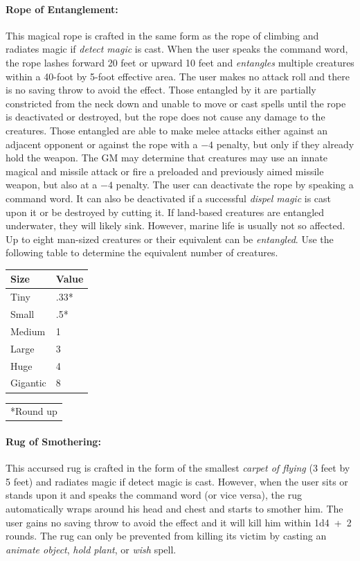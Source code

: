 \begin{multicols}{2}
\paragraph{Rope of Entanglement:} This magical rope is crafted in the same form as the rope of climbing and radiates magic if \textit{detect magic} is cast.  When the user speaks the command word, the rope lashes forward 20 feet or upward 10 feet and \textit{entangles} multiple creatures within a 40-foot by 5-foot effective area.  The user makes no attack roll and there is no saving throw to avoid the effect.  Those entangled by it are partially constricted from the neck down and unable to move or cast spells until the rope is deactivated or destroyed, but the rope does not cause any damage to the creatures.  Those entangled are able to make melee attacks either against an adjacent opponent or against the rope with a $-4$ penalty, but only if they already hold the weapon.  The GM may determine that creatures may use an innate magical and missile attack or fire a preloaded and previously aimed missile weapon, but also at a $-4$ penalty.  The user can deactivate the rope by speaking a command word.  It can also be deactivated if a successful \textit{dispel magic} is cast upon it or be destroyed by cutting it.  If land-based creatures are entangled underwater, they will likely sink.  However, marine life is usually not so affected.  Up to eight man-sized creatures or their equivalent can be \textit{entangled}.  Use the following table to determine the equivalent number of creatures.

\noindent \begin{tabular}{|p{}|p{}|}
\hline
Size	& Value \\
\hline\hline
\rowcolor[gray]{.9}Tiny	& .33* \\
Small	& .5* \\
\rowcolor[gray]{.9}Medium	& 1 \\
Large	& 3 \\
\rowcolor[gray]{.9}Huge	& 4 \\
Gigantic	& 8 \\
\hline
\end{tabular}
\noindent\begin{tabular}{p{}}
*Round up \\
\end{tabular}\vspace{.5em}

\paragraph{Rug of Smothering:} This accursed rug is crafted in the form of the smallest \textit{carpet of flying} (3 feet by 5 feet) and radiates magic if detect magic is cast.  However, when the user sits or stands upon it and speaks the command word (or vice versa), the rug automatically wraps around his head and chest and starts to smother him.  The user gains no saving throw to avoid the effect and it will kill him within 1d4~+~2 rounds.  The rug can only be prevented from killing its victim by casting an \textit{animate object}, \textit{hold plant}, or \textit{wish} spell.


\end{multicols}
